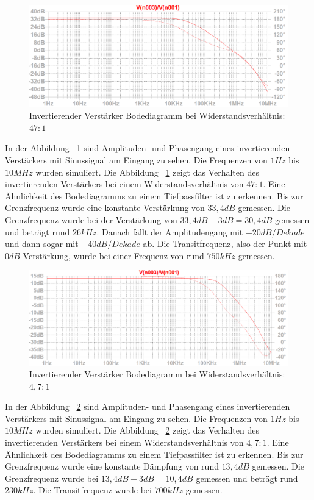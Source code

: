 \documentclass[12pt,a4paper,titlepage]{article}
\begin{document}
\begin{figure}[H]
  \centering
  \includegraphics[width=150mm]{invertierend_bode1}
  \caption{Invertierender Verst\"arker Bodediagramm bei Widerstandsverh\"altnis: $47:1$}
  \label{figure15}
\end{figure}
\noindent In der Abbildung ~\ref{figure15} sind Amplituden- und Phasengang eines invertierenden Verst\"arkers mit Sinussignal am Eingang zu sehen. Die Frequenzen von $1Hz$ bis $10MHz$ wurden simuliert. Die Abbildung ~\ref{figure15} zeigt das Verhalten des invertierenden Verst\"arkers bei einem Widerstandsverh\"altnis von $47:1$. Eine \"Ahnlichkeit des Bodediagramms zu einem Tiefpassfilter ist zu erkennen. Bis zur Grenzfrequenz wurde eine konstante Verst\"arkung von $33,4dB$ gemessen. Die Grenzfrequenz wurde bei der Verst\"arkung von $33,4dB - 3dB = 30,4dB$ gemessen und betr\"agt rund $26kHz$. Danach f\"allt der Amplitudengang mit $-20dB/Dekade$ und dann sogar mit $-40dB/Dekade$ ab. Die Transitfrequenz, also der Punkt mit $0dB$ Verst\"arkung, wurde bei einer Frequenz von rund $750kHz$ gemessen.

\begin{figure}[H]
  \centering
  \includegraphics[width=150mm]{invertierend_bode2}
  \caption{Invertierender Verst\"arker Bodediagramm bei Widerstandsverh\"altnis: $4,7:1$}
  \label{figure16}
\end{figure}
\noindent In der Abbildung ~\ref{figure16} sind Amplituden- und Phasengang eines invertierenden Verst\"arkers mit Sinussignal am Eingang zu sehen. Die Frequenzen von $1Hz$ bis $10MHz$ wurden simuliert. Die Abbildung ~\ref{figure16} zeigt das Verhalten des invertierenden Verst\"arkers bei einem Widerstandsverh\"altnis von $4,7:1$. Eine \"Ahnlichkeit des Bodediagramms zu einem Tiefpassfilter ist zu erkennen. Bis zur Grenzfrequenz wurde eine konstante D\"ampfung von rund $13,4dB$ gemessen. Die Grenzfrequenz wurde bei $13,4dB - 3dB = 10,4dB$ gemessen und betr\"agt rund $230kHz$. Die Transitfrequenz wurde bei $700kHz$ gemessen.
\end{document}
